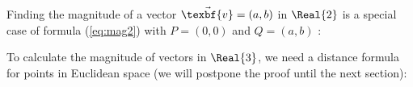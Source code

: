 Finding the magnitude of a vector $\vec{\texbf{v}} = (a,b)$ in $\Real{2}$ is a
special case of formula (\ref{eq:mag2}) with $P = (0,0)$ and $Q = (a,b)$ :

\vspace{3mm}
\vspace{1mm}

To calculate the magnitude of vectors in $\Real{3}$, we need a distance formula for points in Euclidean
space (we will postpone the proof until the next section):

